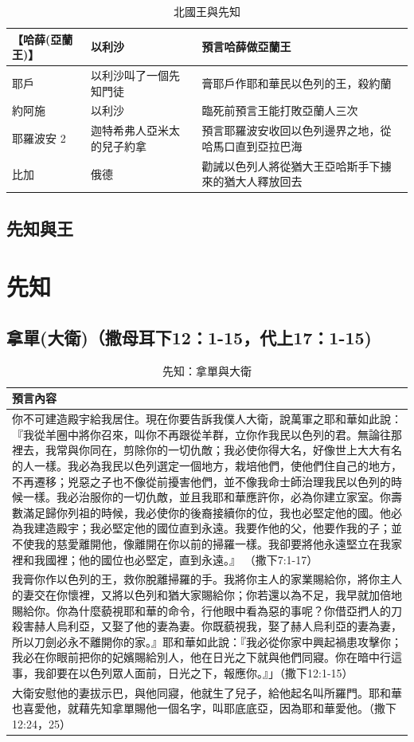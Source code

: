 \begin{table}[!hbp]
\begin{tabular}{|p{1.3cm}|p{2.5cm}|p{13cm}|}
 【哈薛(亞蘭王)】   &   以利沙    & 預言哈薛做亞蘭王   \\\hline  
 耶戶  &  以利沙叫了一個先知門徒   &膏耶戶作耶和華民以色列的王，殺約蘭 \\\hline 
 約阿施   &  以利沙  &臨死前預言王能打敗亞蘭人三次 \\\hline 
 耶羅波安 2    & 迦特希弗人亞米太的兒子約拿  &預言耶羅波安收回以色列邊界之地，從哈馬口直到亞拉巴海 \\\hline 
 比加  &俄德 &勸誡以色列人將從猶大王亞哈斯手下擄來的猶大人釋放回去\\\hline 
\end{tabular} 
\caption{北國王與先知}
\end{table}

\subsection{先知與王}

\newpage
\section{先知}
\subsection{拿單(大衛)（撒母耳下12：1-15，代上17：1-15)}
\begin{table}[!hbp]
\centering
\begin{tabular}{p{16cm}}
\hline
\hline
  預言內容\\\hline\hline
你不可建造殿宇給我居住。現在你要告訴我僕人大衛，說萬軍之耶和華如此說：『我從羊圈中將你召來，叫你不再跟從羊群，立你作我民以色列的君。無論往那裡去，我常與你同在，剪除你的一切仇敵；我必使你得大名，好像世上大大有名的人一樣。我必為我民以色列選定一個地方，栽培他們，使他們住自己的地方，不再遷移；兇惡之子也不像從前擾害他們，並不像我命士師治理我民以色列的時候一樣。我必治服你的一切仇敵，並且我耶和華應許你，必為你建立家室。你壽數滿足歸你列祖的時候，我必使你的後裔接續你的位，我也必堅定他的國。他必為我建造殿宇；我必堅定他的國位直到永遠。我要作他的父，他要作我的子；並不使我的慈愛離開他，像離開在你以前的掃羅一樣。我卻要將他永遠堅立在我家裡和我國裡；他的國位也必堅定，直到永遠。』 （撒下7:1-17）    \\\hline
我膏你作以色列的王，救你脫離掃羅的手。我將你主人的家業賜給你，將你主人的妻交在你懷裡，又將以色列和猶大家賜給你；你若還以為不足，我早就加倍地賜給你。你為什麼藐視耶和華的命令，行他眼中看為惡的事呢？你借亞捫人的刀殺害赫人烏利亞，又娶了他的妻為妻。你既藐視我，娶了赫人烏利亞的妻為妻，所以刀劍必永不離開你的家。』耶和華如此說：『我必從你家中興起禍患攻擊你；我必在你眼前把你的妃嬪賜給別人，他在日光之下就與他們同寢。你在暗中行這事，我卻要在以色列眾人面前，日光之下，報應你。』」（撒下12:1-15）  \\\hline
大衛安慰他的妻拔示巴，與他同寢，他就生了兒子，給他起名叫所羅門。耶和華也喜愛他，就藉先知拿單賜他一個名字，叫耶底底亞，因為耶和華愛他。（撒下12:24，25） \\\hline
\end{tabular} 
\caption{先知：拿單與大衛}
\end{table}


